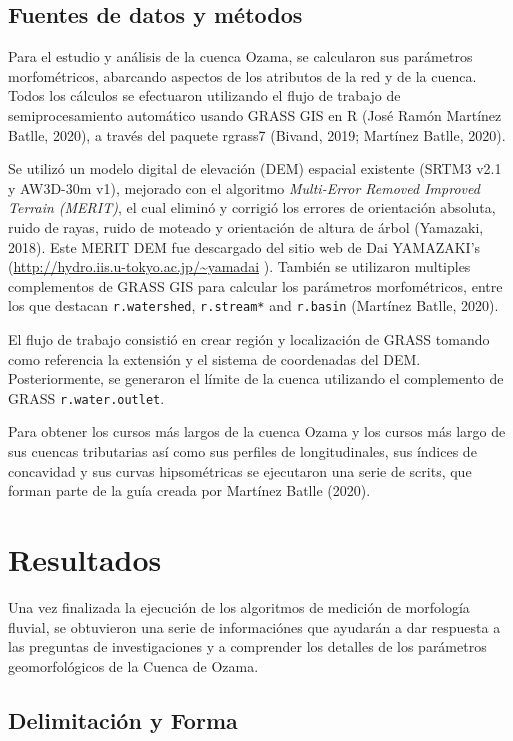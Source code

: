 \documentclass[11pt,]{article}
\begin{document}
\subsection{Fuentes de datos y
métodos}\label{fuentes-de-datos-y-muxe9todos}

Para el estudio y análisis de la cuenca Ozama, se calcularon sus
parámetros morfométricos, abarcando aspectos de los atributos de la red
y de la cuenca. Todos los cálculos se efectuaron utilizando el flujo de
trabajo de semiprocesamiento automático usando GRASS GIS en R (José
Ramón Martínez Batlle, 2020), a través del paquete rgrass7 (Bivand,
2019; Martínez Batlle, 2020).

Se utilizó un modelo digital de elevación (DEM) espacial existente
(SRTM3 v2.1 y AW3D-30m v1), mejorado con el algoritmo \emph{Multi-Error
Removed Improved Terrain (MERIT)}, el cual eliminó y corrigió los
errores de orientación absoluta, ruido de rayas, ruido de moteado y
orientación de altura de árbol (Yamazaki, 2018). Este MERIT DEM fue
descargado del sitio web de Dai YAMAZAKI's
(\url{http://hydro.iis.u-tokyo.ac.jp/~yamadai} ). También se utilizaron
multiples complementos de GRASS GIS para calcular los parámetros
morfométricos, entre los que destacan \texttt{r.watershed},
\texttt{r.stream*} and \texttt{r.basin} (Martínez Batlle, 2020).

El flujo de trabajo consistió en crear región y localización de GRASS
tomando como referencia la extensión y el sistema de coordenadas del
DEM. Posteriormente, se generaron el límite de la cuenca utilizando el
complemento de GRASS \texttt{r.water.outlet}.

Para obtener los cursos más largos de la cuenca Ozama y los cursos más
largo de sus cuencas tributarias así como sus perfiles de
longitudinales, sus índices de concavidad y sus curvas hipsométricas se
ejecutaron una serie de scrits, que forman parte de la guía creada por
Martínez Batlle (2020).

\section{Resultados}\label{resultados}

Una vez finalizada la ejecución de los algoritmos de medición de
morfología fluvial, se obtuvieron una serie de informaciónes que
ayudarán a dar respuesta a las preguntas de investigaciones y a
comprender los detalles de los parámetros geomorfológicos de la Cuenca
de Ozama.

\subsection{Delimitación y Forma}\label{delimitaciuxf3n-y-forma}
\end{document}
